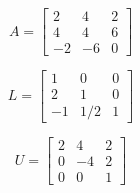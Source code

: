 \[ A=\left[
\begin{array}{ccc}
2 & 4 & 2 \\
4 & 4 & 6\\
-2 & -6 & 0
\end{array}\right]
\]
\bigskip

\[
L=\left[
\begin{array}{ccc}
1 & 0 & 0 \\
2 & 1 & 0\\
-1 & 1/2 & 1
\end{array}
\right]
\]

\[
U=\left[
\begin{array}{ccc}
 2& 4 & 2 \\
 0 & -4 & 2 \\
  0 &0 & 1
\end{array}
\right]
\]
